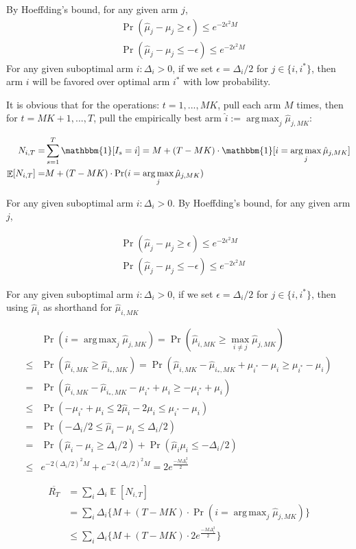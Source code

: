 \documentclass[11pt]{article}
\theoremstyle{case}
\DeclareMathOperator{\E}{\mathbb{E}}
\DeclareMathOperator*{\argmax}{arg\,max}
\begin{document}
By Hoeffding's bound, for any given arm $j$,
\begin{align*}
    &\Pr(\hat{\mu}_j-\mu_j \geq\epsilon)\leq e^{-2\epsilon^2M}\\
    &\Pr(\hat{\mu}_j-\mu_j \leq - \epsilon)\leq e^{-2\epsilon^2M}
\end{align*}
For any given suboptimal arm $i: \Delta_i>0$, if we set $\epsilon=\Delta_i/2$ for $j\in\{i, i^*\}$, then arm $i$ will be favored over optimal arm $i^*$ with low probability. 

\begin{shaded}
It is obvious that for the operations: $t=1,...,MK$, pull each arm $M$ times, then for $t=MK+1,...,T$, pull the empirically best arm $\hat{i}:=\argmax_j \hat{\mu}_{j, MK}$:

\begin{align*}
    N_{i,T} =& \sum_{s=1}^{T}\mathbbm{1}[I_s=i] =  M + (T-MK)\cdot \mathbbm{1}[i=\argmax_j \hat{\mu}_{j, MK}] \\
    \E[N_{i,T}] =& M + (T-MK)\cdot \Pr(i=\argmax_j \hat{\mu}_{j, MK})
\end{align*}

For any given suboptimal arm $i: \Delta_i>0$. By Hoeffding's bound, for any given arm $j$,

\begin{align*}
    &\Pr(\hat{\mu}_j-\mu_j \geq\epsilon)\leq e^{-2\epsilon^2M}\\
    &\Pr(\hat{\mu}_j-\mu_j \leq - \epsilon)\leq e^{-2\epsilon^2M}
\end{align*}

For any given suboptimal arm $i: \Delta_i>0$, if we set $\epsilon=\Delta_i/2$ for $j\in\{i, i^*\}$, then  using $\hat{\mu}_i$ as shorthand for $\hat{\mu}_{i,MK}$

\begin{align*}
   & \Pr(i=\argmax_j \hat{\mu}_{j, MK}) = \Pr(\hat{\mu}_{i, MK} \geq \max_{i \neq j} \hat{\mu}_{j, MK}) \\
\leq &  \Pr(\hat{\mu}_{i, MK} \geq \hat{\mu}_{i_*, MK}) = \Pr(\hat{\mu}_{i, MK} - \hat{\mu}_{i_*, MK} + \mu_{i^*} -\mu_{i} \geq \mu_{i^*} -\mu_{i} )\\
= & \Pr(\hat{\mu}_{i, MK} - \hat{\mu}_{i_*, MK} - \mu_{i^*} + \mu_{i} \geq - \mu_{i^*} + \mu_{i} )\\
\leq &  \Pr( - \mu_{i^*} + \mu_{i} \leq 2 \hat{\mu}_i-2 \mu_i \leq \mu_{i^*} -\mu_{i})\\
 = &	\Pr( -\Delta_i/2 \leq \hat{\mu}_i-\mu_i \leq \Delta_i/2) \\
 = & \Pr(\hat{\mu}_i-\mu_i \geq \Delta_i/2) + \Pr(\hat{\mu}_i\mu_i \leq - \Delta_i/2)\\
\leq & e^{-2(\Delta_i/2)^2M} + e^{-2(\Delta_i/2)^2M} = 2e^{\frac{-M\Delta_i^2}{2}}
\end{align*}

\begin{align*}
\overline{R_T} & =\sum_i \Delta_i \E[N_{i,T}]\\
& = \sum_i \Delta_i \{M + (T-MK)\cdot \Pr(i=\argmax_j \hat{\mu}_{j, MK}) \}\\
& \leq \sum_i \Delta_i \{M + (T-MK)\cdot 2e^{\frac{-M\Delta_i^2}{2}} \}
\end{align*}

\end{shaded}
\end{document}
